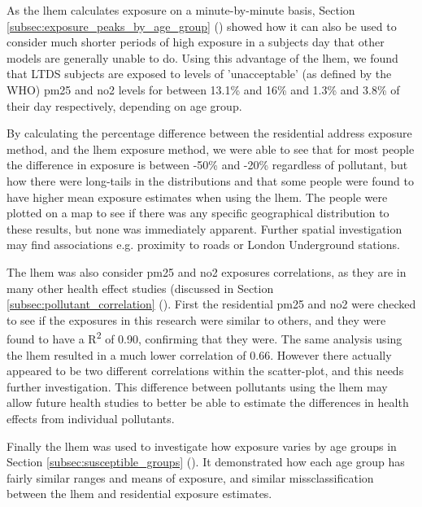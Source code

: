 
As the \gls{lhem} calculates exposure on a minute-by-minute basis, Section \ref{subsec:exposure_peaks_by_age_group} () showed how it can also be used to consider much shorter periods of high exposure in a subjects day that other models are generally unable to do. Using this advantage of the \gls{lhem}, we found that  LTDS subjects are exposed to levels of 'unacceptable' (as defined by the WHO) \gls{pm25} and \gls{no2} levels for between 13.1\% and 16\% and 1.3\% and 3.8\% of their day respectively, depending on age group.


By calculating the percentage difference between the residential address exposure method, and the \gls{lhem} exposure method, we were able to see that for most people the difference in exposure is between -50\% and -20\% regardless of pollutant, but how there were long-tails in the distributions and that some people were found to have higher mean exposure estimates when using the \gls{lhem}. The people were plotted on a map to see if there was any specific geographical distribution to these results, but none was immediately apparent. Further spatial investigation may find associations e.g. proximity to roads or London Underground stations.


The \gls{lhem} was also consider \gls{pm25} and \gls{no2} exposures correlations, as they are in many other health effect studies (discussed in Section \ref{subsec:pollutant_correlation} (). First the residential \gls{pm25} and \gls{no2} were checked to see if the exposures in this research were similar to others, and they were found to have a R\textsuperscript{2} of 0.90, confirming that they were. The same analysis using the \gls{lhem} resulted in a much lower correlation of 0.66. However there actually appeared to be two different correlations within the scatter-plot, and this needs further investigation. This difference between pollutants using the \gls{lhem} may allow future health studies to better be able to estimate the differences in health effects from individual pollutants.


Finally the \gls{lhem} was used to investigate how exposure varies by age groups in Section \ref{subsec:susceptible_groups} (). It demonstrated how each age group has fairly similar ranges and means of exposure, and similar missclassification between the \gls{lhem} and residential exposure estimates.